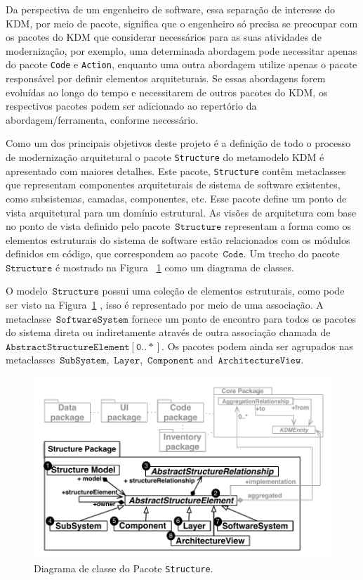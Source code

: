 \documentclass[12pt]{article}
\begin{document}
Da perspectiva de um engenheiro de software, essa separação de interesse do KDM, por meio de pacote, significa que o engenheiro só precisa se preocupar com os pacotes do KDM que considerar necessários para as suas atividades de modernização, por exemplo, uma determinada abordagem pode necessitar apenas do pacote \texttt{Code} e \texttt{Action}, enquanto uma outra abordagem utilize apenas o pacote responsável por definir elementos arquiteturais. Se essas abordagens forem evoluídas ao longo do tempo e necessitarem de outros pacotes do KDM, os respectivos pacotes podem ser adicionado ao repertório da abordagem/ferramenta, conforme necessário.

Como um dos principais objetivos deste projeto é a definição de todo o processo de modernização arquitetural o pacote \texttt{Structure} do metamodelo KDM é apresentado com maiores detalhes. Este pacote, \texttt{Structure} contêm metaclasses que representam componentes arquiteturais de sistema de software existentes, como subsistemas, camadas, componentes, etc. Esse pacote define um ponto de vista arquitetural para um domínio estrutural. As visões de arquitetura com base no ponto de vista definido pelo pacote~$\mathtt{Structure}$ representam a forma como os elementos estruturais do sistema de software estão relacionados com os módulos definidos em código, que correspondem ao pacote~$\mathtt{Code}$. Um trecho do pacote~$\mathtt{Structure}$ é mostrado na Figura ~\ref{fig:structureModel} como um diagrama de classes.

O modelo~$\mathtt{Structure}$ possui uma coleção de elementos estruturais, como pode ser visto na Figura~\ref{fig:structureModel} , isso é representado por meio de uma associação. A metaclasse~$\mathtt{SoftwareSystem}$ fornece um ponto de encontro para todos os pacotes do sistema direta ou indiretamente através de outra associação chamada de~$\mathtt{AbstractStructureElement[0..*]}$. Os pacotes podem ainda ser agrupados nas metaclasses~$\mathtt{SubSystem}$,~$\mathtt{Layer}$,~$\mathtt{Component}$ and~$\mathtt{ArchitectureView}$.


\begin{figure}[h]
 \centering
 \includegraphics[scale=0.8]{StructurePackageFigure.pdf}
 \caption{Diagrama de classe do Pacote \texttt{Structure}.}
 \label{fig:structureModel}
\end{figure}
\end{document}
